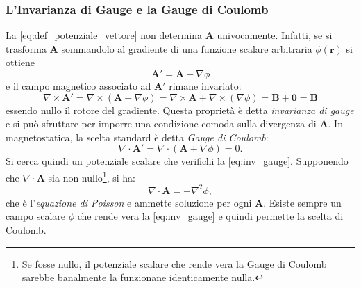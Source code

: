 \documentclass[a4paper,11pt]{report}
\begin{document}
    \subsubsection{L'Invarianza di Gauge e la Gauge di Coulomb}
La \eqref{eq:def_potenziale_vettore} non determina $\bm{A}$ univocamente. Infatti, se si trasforma $\bm{A}$ sommandolo al gradiente di una funzione scalare arbitraria $\phi(\bm{r})$ si ottiene
\begin{equation}
    \bm{A}' = \bm{A} + \nabla \phi
\end{equation}
e il campo magnetico associato ad $\bm{A}'$ rimane invariato:
\begin{equation}
    \nabla \times \bm{A}' = \nabla \times (\bm{A} + \nabla \phi) = \nabla \times \bm{A} + \nabla \times (\nabla \phi) = \bm{B} + \bm{0} = \bm{B}
\end{equation}
essendo nullo il rotore del gradiente. Questa proprietà è detta \textit{invarianza di gauge} e si può sfruttare per imporre una condizione comoda sulla divergenza di $\bm{A}$. In magnetostatica, la scelta standard è detta \textit{Gauge di Coulomb}:
\begin{equation}
    \nabla \cdot \bm{A}' = \nabla \cdot (\bm{A} + \nabla \phi) = 0.
    \label{eq:inv_gauge}
\end{equation}
Si cerca quindi un potenziale scalare che verifichi la \eqref{eq:inv_gauge}. Supponendo che $\nabla \cdot \bm{A}$ sia non nullo\footnote{Se fosse nullo, il potenziale scalare che rende vera la Gauge di Coulomb sarebbe banalmente la funzionane identicamente nulla.}, si ha: 
\begin{equation}
    \nabla \cdot \bm{A} = -\nabla^2   \phi,
\end{equation}
che è l'\textit{equazione di Poisson} e ammette soluzione per ogni $\bm{A}$. Esiste sempre un campo scalare $\phi$ che rende vera la \eqref{eq:inv_gauge} e quindi permette la scelta di Coulomb.
\end{document}
